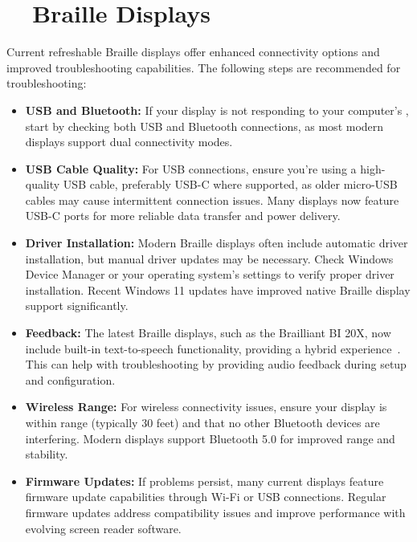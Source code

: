 \section{~~Braille Displays}
\label{app2:display2}
Current refreshable Braille displays offer enhanced connectivity options and improved troubleshooting capabilities. The following steps are recommended for troubleshooting:

\begin{itemize}
	\item \textbf{USB and Bluetooth:} If your display is not responding to your computer's , start by checking both USB and Bluetooth connections, as most modern displays support dual connectivity modes.
	\item \textbf{USB Cable Quality:} For USB connections, ensure you're using a high-quality USB cable, preferably USB-C where supported, as older micro-USB cables may cause intermittent connection issues. Many displays now feature USB-C ports for more reliable data transfer and power delivery.
	\item \textbf{Driver Installation:} Modern Braille displays often include automatic driver installation, but manual driver updates may be necessary. Check Windows Device Manager or your operating system's  settings to verify proper driver installation. Recent Windows 11 updates have improved native Braille display support significantly.
	\item \textbf{ Feedback:} The latest Braille displays, such as the Brailliant BI 20X, now include built-in text-to-speech functionality, providing a hybrid experience~\supercite{BrailliantBI20X}. This can help with troubleshooting by providing audio feedback during setup and configuration.
	\item \textbf{Wireless Range:} For wireless connectivity issues, ensure your display is within range (typically 30 feet) and that no other Bluetooth devices are interfering. Modern displays support Bluetooth 5.0 for improved range and stability.
	\item \textbf{Firmware Updates:} If problems persist, many current displays feature firmware update capabilities through Wi-Fi or USB connections. Regular firmware updates address compatibility issues and improve performance with evolving screen reader software.
\end{itemize}

